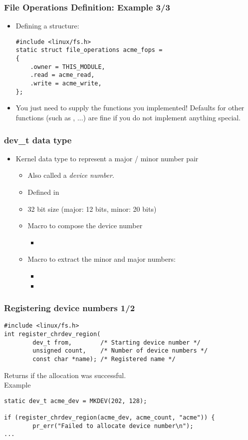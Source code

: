 \begin{frame}[fragile]
  \frametitle{File Operations Definition: Example 3/3}
  \begin{itemize}
  \item Defining a  structure:
\begin{verbatim}
#include <linux/fs.h>
static struct file_operations acme_fops =
{
    .owner = THIS_MODULE,
    .read = acme_read,
    .write = acme_write,
};
\end{verbatim}
  \item You just need to supply the functions you implemented!
    Defaults for other functions (such as , ...) are fine
    if you do not implement anything special.
  \end{itemize}
\end{frame}

\begin{frame}
  \frametitle{dev\_t data type}
  \begin{itemize}
  \item Kernel data type to represent a major / minor number pair
    \begin{itemize}
    \item Also called a \emph{device number}.
    \item Defined in 
    \item 32 bit size (major: 12 bits, minor: 20 bits)
    \item Macro to compose the device number
      \begin{itemize}
      \item {}
      \end{itemize}
    \item Macro to extract the minor and major numbers:
      \begin{itemize}
      \item {}
      \item {}
      \end{itemize}
  \end{itemize}
\end{itemize}
\end{frame}

\begin{frame}[fragile]
  \frametitle{Registering device numbers 1/2}
\begin{verbatim}
#include <linux/fs.h>
int register_chrdev_region(
        dev_t from,        /* Starting device number */
        unsigned count,    /* Number of device numbers */
        const char *name); /* Registered name */
\end{verbatim}
Returns  if the allocation was successful.\\
Example
\begin{verbatim}
static dev_t acme_dev = MKDEV(202, 128);

if (register_chrdev_region(acme_dev, acme_count, "acme")) {
        pr_err("Failed to allocate device number\n");
...
\end{verbatim}
\end{frame}

